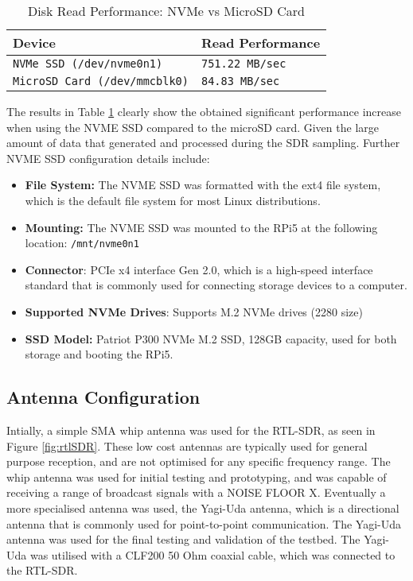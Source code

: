\begin{table}[h!]
    \centering
    \caption{Disk Read Performance: NVMe vs MicroSD Card \label{tab:diskperf}}
    \begin{tabular}{|l|l|}
    \hline
    \textbf{Device} & \textbf{Read Performance} \\ \hline
    \texttt{NVMe SSD (\texttt{/dev/nvme0n1})} & \texttt{751.22 MB/sec} \\ \hline
    \texttt{MicroSD Card (\texttt{/dev/mmcblk0})} & \texttt{84.83 MB/sec} \\ \hline
    \end{tabular}
\end{table}

The results in Table \ref{tab:diskperf} clearly show the obtained significant performance increase when using the NVME SSD compared to the microSD card. Given the large amount of data that generated and processed during the SDR sampling. Further NVME SSD configuration details include: 

\begin{itemize}
    \item \textbf{File System:} The NVME SSD was formatted with the ext4 file system, which is the default file system for most Linux distributions. 
    \item \textbf{Mounting:} The NVME SSD was mounted to the RPi5 at the following location: \texttt{/mnt/nvme0n1}
    \item \textbf{Connector}: PCIe x4 interface Gen 2.0, which is a high-speed interface standard that is commonly used for connecting storage devices to a computer.
    \item \textbf{Supported NVMe Drives}: Supports M.2 NVMe drives (2280 size)
    \item \textbf{SSD Model:} Patriot P300 NVMe M.2 SSD, 128GB capacity, used for both storage and booting the RPi5.
\end{itemize}


\subsection{Antenna Configuration \label{sec:antenna}}
Intially, a simple SMA whip antenna was used for the RTL-SDR, as seen in Figure \ref{fig:rtlSDR}. These low cost antennas are typically used for general purpose reception, and are not optimised for any specific frequency range. The whip antenna was used for initial testing and prototyping, and was capable of receiving a range of broadcast signals with a NOISE FLOOR X. Eventually a more specialised antenna was used, the Yagi-Uda antenna, which is a directional antenna that is commonly used for point-to-point communication. The Yagi-Uda antenna was used for the final testing and validation of the testbed. The Yagi-Uda was utilised with a CLF200 50 Ohm coaxial cable, which was connected to the RTL-SDR. 


